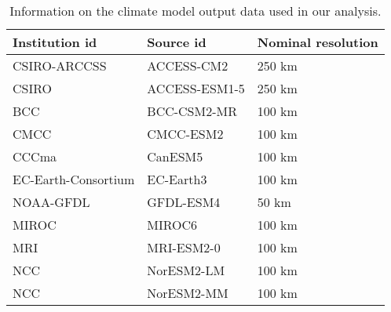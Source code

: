 \begin{table}

\caption{\label{tab:climate_model_info}Information on the climate model output data used in our analysis.}
\centering
\begin{tabular}[t]{lll}
\toprule
Institution id & Source id & Nominal resolution\\
\midrule
CSIRO-ARCCSS & ACCESS-CM2 & 250 km\\
CSIRO & ACCESS-ESM1-5 & 250 km\\
BCC & BCC-CSM2-MR & 100 km\\
CMCC & CMCC-ESM2 & 100 km\\
CCCma & CanESM5 & 100 km\\
\addlinespace
EC-Earth-Consortium & EC-Earth3 & 100 km\\
NOAA-GFDL & GFDL-ESM4 & 50 km\\
MIROC & MIROC6 & 100 km\\
MRI & MRI-ESM2-0 & 100 km\\
NCC & NorESM2-LM & 100 km\\
\addlinespace
NCC & NorESM2-MM & 100 km\\
\bottomrule
\end{tabular}
\end{table}